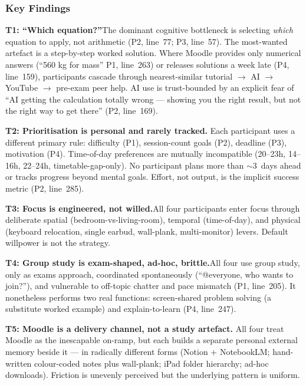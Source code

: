 \documentclass[a4paper,11pt]{article}
\begin{document}
\subsubsection*{Key Findings}

\textbf{T1: ``Which equation?''}\quad The dominant cognitive
bottleneck is selecting \emph{which} equation to apply, not arithmetic
(P2, line~77; P3, line~57). The most-wanted artefact is a
step-by-step worked solution. Where Moodle provides only numerical
answers (``560 kg for mass'' P1, line~263) or releases solutions
a week late (P4, line~159), participants cascade through
nearest-similar tutorial $\rightarrow$ AI $\rightarrow$ YouTube
$\rightarrow$ pre-exam peer help. AI use is trust-bounded by an
explicit fear of ``AI getting the calculation totally wrong --- showing
you the right result, but not the right way to get there'' (P2,
line~169).

\textbf{T2: Prioritisation is personal and rarely tracked.}\quad
Each participant uses a different primary rule: difficulty (P1),
session-count goals (P2), deadline (P3), motivation (P4). Time-of-day
preferences are mutually incompatible (20--23h, 14--16h, 22--24h,
timetable-gap-only). No participant plans more than ${\sim}3$~days
ahead or tracks progress beyond mental goals. Effort, not output, is
the implicit success metric (P2, line~285).

\textbf{T3: Focus is engineered, not willed.}\quad All four
participants enter focus through deliberate spatial (bedroom-vs-living-room),
temporal (time-of-day), and physical (keyboard relocation, single
earbud, wall-plank, multi-monitor) levers. Default willpower is not
the strategy.

\textbf{T4: Group study is exam-shaped, ad-hoc, brittle.}\quad All
four use group study, only as exams approach, coordinated spontaneously
(``@everyone, who wants to join?''), and vulnerable to off-topic
chatter and pace mismatch (P1, line~205). It nonetheless performs two
real functions: screen-shared problem solving (a substitute worked
example) and explain-to-learn (P4, line~247).

\textbf{T5: Moodle is a delivery channel, not a study artefact.}\quad
All four treat Moodle as the inescapable on-ramp, but each builds a
separate personal external memory beside it --- in radically different
forms (Notion + NotebookLM; hand-written colour-coded notes plus
wall-plank; iPad folder hierarchy; ad-hoc downloads). Friction is
unevenly perceived but the underlying pattern is uniform.
\end{document}
